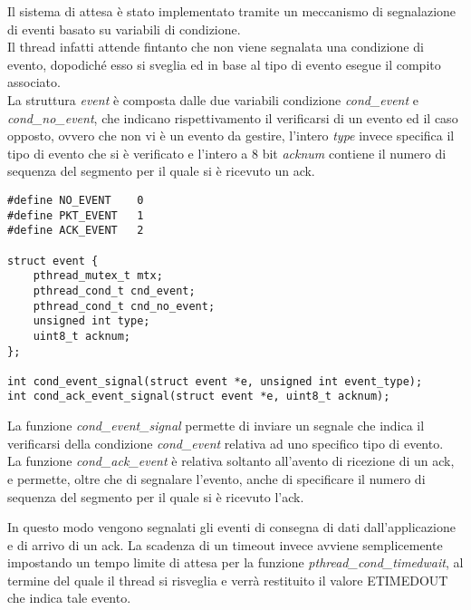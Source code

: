 Il sistema di attesa è stato implementato tramite un meccanismo di segnalazione
di eventi basato su variabili di condizione.\\
Il thread infatti attende fintanto che non viene segnalata una condizione di
evento, dopodiché esso si sveglia ed in base al tipo di evento 
esegue il compito associato.\\
La struttura \emph{event} è composta dalle due variabili condizione 
\emph{cond\_event} e \emph{cond\_no\_event}, che indicano rispettivamento
il verificarsi di un evento ed il caso opposto, ovvero che non vi è un evento
da gestire, l'intero \emph{type} invece specifica il tipo di evento che si è
verificato e l'intero a 8 bit \emph{acknum} contiene il numero di sequenza del
segmento per il quale si è ricevuto un ack.

\begin{lstlisting}[title=event.h]
#define NO_EVENT	0
#define PKT_EVENT	1
#define ACK_EVENT	2

struct event {
	pthread_mutex_t mtx;
	pthread_cond_t cnd_event;
	pthread_cond_t cnd_no_event;
	unsigned int type;
	uint8_t acknum;
};

int cond_event_signal(struct event *e, unsigned int event_type);
int cond_ack_event_signal(struct event *e, uint8_t acknum);
\end{lstlisting}

La funzione \emph{cond\_event\_signal} permette di inviare un segnale che indica il
verificarsi della condizione \emph{cond\_event} relativa ad uno specifico tipo di 
evento.\\
La funzione \emph{cond\_ack\_event} è relativa soltanto all'avento di ricezione
di un ack, e permette, oltre che di segnalare l'evento, anche di specificare
il numero di sequenza del segmento per il quale si è ricevuto l'ack.

In questo modo vengono segnalati gli eventi di consegna di dati dall'applicazione
e di arrivo di un ack. La scadenza di un timeout invece avviene semplicemente 
impostando un tempo limite di attesa per la funzione \emph{pthread\_cond\_timedwait},
al termine del quale il thread si risveglia e verrà restituito il valore ETIMEDOUT 
che indica tale evento.


